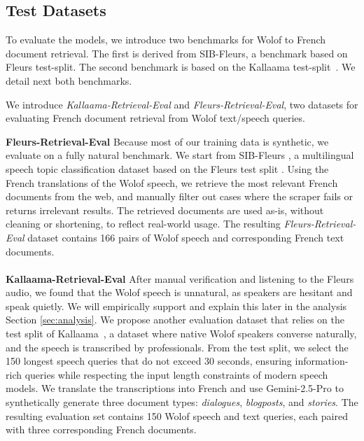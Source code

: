 \documentclass[11pt]{article}
\newcommand{\myparagraph}[1]{\noindent\textbf{#1}}
\begin{document}
\subsection{Test Datasets}
To evaluate the models, we introduce two benchmarks for Wolof to French document retrieval. The first is derived from SIB-Fleurs, a benchmark based on Fleurs test-split. The second benchmark is based on the Kallaama test-split~\cite{kallama}. We detail next both benchmarks.
\begin{tcolorbox}[compactbox,colback=violet!15!white,colframe=violet!100!white,title={\color{black} \textbf{Artefact 1}: Evaluation Datasets for French document retrieval from Wolof queries.}]
We introduce \textit{Kallaama-Retrieval-Eval} and \textit{Fleurs-Retrieval-Eval}, two datasets for evaluating French document retrieval from Wolof text/speech queries.
\end{tcolorbox}
\myparagraph{Fleurs-Retrieval-Eval} Because most of our training data is synthetic, we evaluate on a fully natural benchmark. We start from SIB-Fleurs \citep{schmidt2025fleursslumassivelymultilingualbenchmark}, a multilingual speech topic classification dataset based on the Fleurs test split \citep{fleurs}. Using the French translations of the Wolof speech, we retrieve the most relevant French documents from the web, and manually filter out cases where the scraper fails or returns irrelevant results. The retrieved documents are used as-is, without cleaning or shortening, to reflect real-world usage. The resulting \textit{Fleurs-Retrieval-Eval} dataset contains 166 pairs of Wolof speech and corresponding French text documents.
\\
\\
\myparagraph{Kallaama-Retrieval-Eval} After manual verification and listening to the Fleurs audio, we found that the Wolof speech is unnatural, as speakers are hesitant and speak quietly. We will empirically support and explain this later in the analysis Section \ref{sec:analysis}. We propose another evaluation dataset that relies on the test split of Kallaama~\cite{kallama}, a dataset where native Wolof speakers converse naturally, and the speech is transcribed by professionals. From the test split, we select the 150 longest speech queries that do not exceed 30 seconds, ensuring information-rich queries while respecting the input length constraints of modern speech models. We translate the transcriptions into French and use Gemini-2.5-Pro to synthetically generate three document types: \textit{dialogues}, \textit{blogposts}, and \textit{stories}. The resulting evaluation set contains 150 Wolof speech and text queries, each paired with three corresponding French documents.
\end{document}
